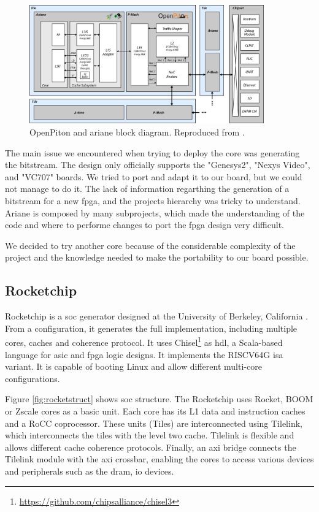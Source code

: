 \begin{figure}[h]
    \centering
    \includegraphics[width=0.9\textwidth]{images/openpiton_ariane_blockdiag.png}
    \caption{OpenPiton and ariane block diagram. Reproduced from \cite{openpitonrepo}.}
    \label{fig:openpitonariane}
\end{figure}

The main issue we encountered when trying to deploy the core was generating the bitstream. The design only officially supports the "Genesys2", "Nexys Video", and "VC707" boards. We tried to port and adapt it to our board, but we could not manage to do it. 
The lack of information regarthing the generation of a bitstream for a new \gls{fpga}, and the projects hierarchy was tricky to understand.
Ariane is composed by many subprojects, which made the understanding of the code and where to performe changes to port the \gls{fpga} design very difficult.

We decided to try another core because of the considerable complexity of the project and the knowledge needed to make the portability to our board possible.

\subsection{Rocketchip}
Rocketchip is a \gls{soc} generator designed at the University of Berkeley, California \cite{rocket}. From a configuration, it generates the full implementation, including multiple cores, caches and coherence protocol. It uses Chisel\footnote{\url{https://github.com/chipsalliance/chisel3}} as \gls{hdl}, a Scala-based language for \gls{asic} and \gls{fpga} logic designs. It implements the RISCV64G \gls{isa} variant. It is capable of booting Linux and allow different multi-core configurations.

Figure \ref{fig:rocketstruct} shows \gls{soc} structure. The Rocketchip uses Rocket, BOOM or Zscale cores as a basic unit. Each core has its L1 data and instruction caches and a RoCC coprocessor. These units (Tiles) are interconnected using Tilelink, which interconnects the tiles with the level two cache. Tilelink is flexible and allows different cache coherence protocols. Finally, an \gls{axi} bridge connects the Tilelink module with the \gls{axi} crossbar, enabling the cores to access various devices and peripherals such as the \gls{dram}, \gls{io} devices.

